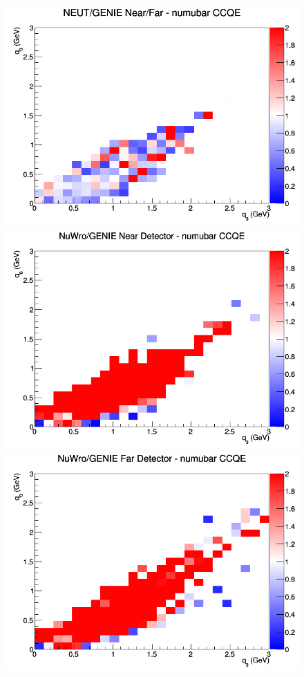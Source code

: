 \documentclass[12pt]{article}
\begin{document}
\begin{figure}[h]
\endminipage
{}
\includegraphics[width=\linewidth]{eff_q0_q3/GAr/ratios/CCQE_NEUT_GENIE_numubar_NF_q3_q0.png}
\endminipage
\newline
{}
\includegraphics[width=\linewidth]{eff_q0_q3/GAr/ratios/CCQE_NuWro_GENIE_numubar_near_q3_q0.png}
\endminipage
{}
\includegraphics[width=\linewidth]{eff_q0_q3/GAr/ratios/CCQE_NuWro_GENIE_numubar_far_q3_q0.png}

\end{figure}
\end{document}

